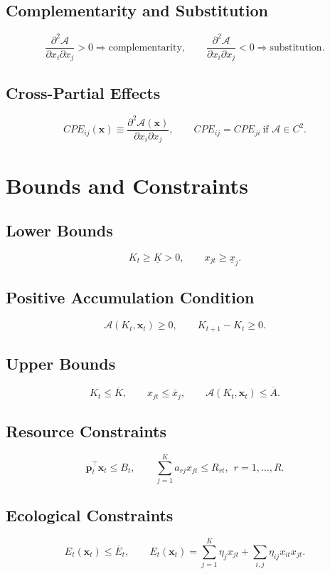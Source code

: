\documentclass[11pt]{article}
\begin{document}
\subsection{Complementarity and Substitution}
\[
\frac{\partial^2\mathcal{A}}{\partial x_i\partial x_j}>0\Rightarrow \text{complementarity},
\qquad
\frac{\partial^2\mathcal{A}}{\partial x_i\partial x_j}<0\Rightarrow \text{substitution}.
\]

\subsection{Cross-Partial Effects}
\[
CPE_{ij}(\bm{x})\equiv\frac{\partial^2\mathcal{A}(\bm{x})}{\partial x_i\partial x_j},
\qquad CPE_{ij}=CPE_{ji}\ \text{if }\mathcal{A}\in C^2.
\]

\section{Bounds and Constraints}

\subsection{Lower Bounds}
\[
K_t\ge \underline{K}>0,
\qquad x_{jt}\ge \underline{x}_j.
\]

\subsection{Positive Accumulation Condition}
\[
\mathcal{A}(K_t,\bm{x}_t)\ge 0,
\qquad K_{t+1}-K_t\ge 0.
\]

\subsection{Upper Bounds}
\[
K_t\le \overline{K},
\qquad x_{jt}\le \overline{x}_j,
\qquad \mathcal{A}(K_t,\bm{x}_t)\le \overline{A}.
\]

\subsection{Resource Constraints}
\[
\bm{p}_t^\top\bm{x}_t\le B_t,
\qquad \sum_{j=1}^K a_{rj}x_{jt}\le R_{rt},\ \ r=1,\dots,R.
\]

\subsection{Ecological Constraints}
\[
E_t(\bm{x}_t)\le \overline{E}_t,
\qquad E_t(\bm{x}_t)=\sum_{j=1}^K \eta_j x_{jt}+\sum_{i,j}\eta_{ij}x_{it}x_{jt}.
\]
\end{document}

